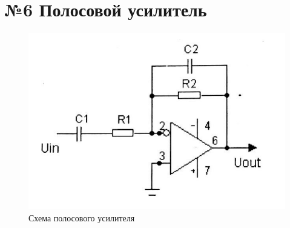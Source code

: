 \documentclass[a4paper]{article}
\begin{document}
\section{№6 Полосовой усилитель}

\begin{figure}[H]
    \begin{center}
        \includegraphics[scale = 0.4]{p6.jpg}
        \caption{Схема полосового усилителя}
        \label{p6}
    \end{center}
\end{figure}
\end{document}

